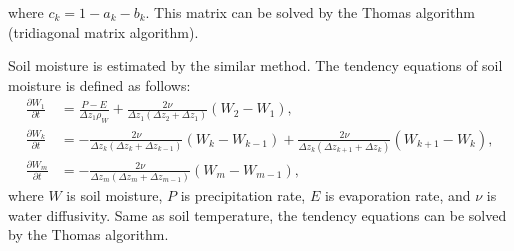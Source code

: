 where $c_{k} = 1 - a_{k} - b_{k}$.
This matrix can be solved by the Thomas algorithm (tridiagonal matrix algorithm).

Soil moisture is estimated by the similar method.
The tendency equations of soil moisture is defined as follows:
\begin{align}
  \frac{\partial W_{1}}{\partial t} &= \frac{P - E}{\Delta z_{1} \rho_{W}} + \frac{2\nu}{\Delta z_{1}(\Delta z_{2}+\Delta z_{1})} (W_{2}-W_{1}), \\
  \frac{\partial W_{k}}{\partial t} &= - \frac{2\nu}{\Delta z_{k}(\Delta z_{k}+\Delta z_{k-1})} (W_{k}-W_{k-1}) + \frac{2\nu}{\Delta z_{k}(\Delta z_{k+1}+\Delta z_{k})} (W_{k+1}-W_{k}), \\
  \frac{\partial W_{m}}{\partial t} &= - \frac{2\nu}{\Delta z_{m}(\Delta z_{m}+\Delta z_{m-1})} (W_{m}-W_{m-1}),
\end{align}
where $W$ is soil moisture, $P$ is precipitation rate, $E$ is evaporation rate, and $\nu$ is water diffusivity.
Same as soil temperature, the tendency equations can be solved by the Thomas algorithm.
